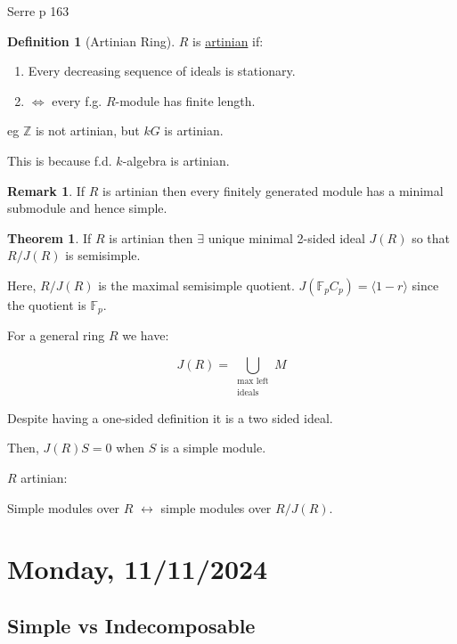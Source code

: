 \documentclass{article}
\theoremstyle{definition}
\newtheorem*{definition}{Definition}
\newtheorem{theorem}{Theorem}
\newtheorem*{remark}{Remark}
\begin{document}
Serre p 163

\begin{definition}
    [Artinian Ring] \(R\) is \underline{artinian} if:

    \begin{enumerate}[label=\roman*)]
        \item Every decreasing sequence of ideals is stationary.
        \item \(\iff\) every f.g. \(R\)-module has finite length.
    \end{enumerate} 
\end{definition}

eg \(\mathbb{Z}\) is not artinian, but \(kG\) is artinian.

This is because f.d. \(k\)-algebra is artinian.

\begin{remark}
    If \(R\) is artinian then every finitely generated module has a minimal submodule and hence simple.
\end{remark}

\begin{theorem}
    If \(R\) is artinian then \(\exists\) unique minimal 2-sided ideal \(J(R)\) so that \(R / J(R)\) is semisimple.
\end{theorem}

Here, \(R / J(R)\) is the maximal semisimple quotient. \(J(\mathbb{F}_p C_p) = \langle 1 - r \rangle\) since the quotient is \(\mathbb{F}_p\).

For a general ring \(R\) we have:

\[
    J(R) = \bigcup_{\substack{\text{max left} \\ \text{ideals}}} M
\]

Despite having a one-sided definition it is a two sided ideal.

Then, \(J(R)S = 0\) when \(S\) is a simple module.

\(R\) artinian:

Simple modules over \(R\) \(\leftrightarrow\) simple modules over \(R / J(R)\).

\section*{Monday, 11/11/2024}

\subsection*{Simple vs Indecomposable}
\end{document}
